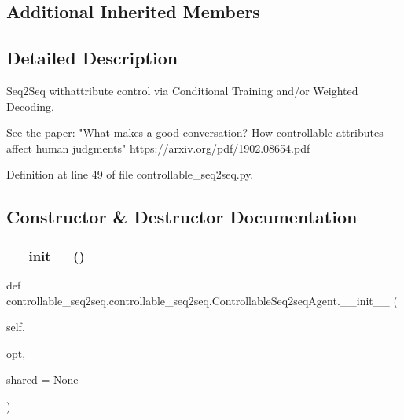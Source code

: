 \subsection*{Additional Inherited Members}


\subsection{Detailed Description}
\begin{DoxyVerb}Seq2Seq withattribute control via Conditional Training and/or Weighted Decoding.

See the paper:
"What makes a good conversation? How controllable attributes affect human judgments"
https://arxiv.org/pdf/1902.08654.pdf
\end{DoxyVerb}
 

Definition at line 49 of file controllable\+\_\+seq2seq.\+py.



\subsection{Constructor \& Destructor Documentation}
\mbox{\label{classcontrollable__seq2seq_1_1controllable__seq2seq_1_1ControllableSeq2seqAgent_a2cbe8ed3b2b6b82be90db6b45331800b}} 
\subsubsection{\texorpdfstring{\+\_\+\+\_\+init\+\_\+\+\_\+()}{\_\_init\_\_()}}
{\footnotesize\ttfamily def controllable\+\_\+seq2seq.\+controllable\+\_\+seq2seq.\+Controllable\+Seq2seq\+Agent.\+\_\+\+\_\+init\+\_\+\+\_\+ (\begin{DoxyParamCaption}\item[{}]{self,  }\item[{}]{opt,  }\item[{}]{shared = {\ttfamily None} }\end{DoxyParamCaption})}


